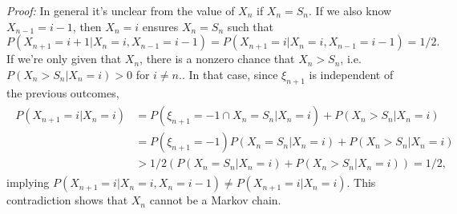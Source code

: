 \documentclass[10pt]{article}
\begin{document}
\textit{Proof:} In general it's unclear from the value of $X_n$ if $X_n = S_n$. 
If we also know $X_{n-1} = i-1$, then $X_{n}=i$ ensures $X_n = S_n$
such that
\begin{equation*}
  P(X_{n+1} = i+1| X_n = i, X_{n-1} = i-1) 
  = P(X_{n+1} = i \vert X_n = i, X_{n-1} = i-1) = 1/2.
\end{equation*}
If we're only given that $X_n$, there is a nonzero chance that
$X_n > S_n$, i.e. $P(X_n > S_n \vert X_n = i) > 0 $ for $i \ne n$..
In that case, since $\xi_{n+1}$ is independent of the previous outcomes,
\begin{eqnarray}
\begin{aligned}
  P(X_{n+1} = i \vert X_n = i)
  & = P(\xi_{n+1} = - 1  \cap X_n = S_n\vert X_n = i) + P(X_n > S_n \vert X_n = i) \\ 
  & = P(\xi_{n+1} = -1) P(X_n = S_n\vert X_n = i) + P(X_n > S_n \vert X_n = i) \\ 
  & > 1/2 \left( P(X_n = S_n\vert X_n = i) + P(X_n > S_n \vert X_n = i) \right) = 1/2,
\end{aligned}
\end{eqnarray}
implying $P(X_{n+1} = i \vert X_n = i, X_{n}=i-1) \ne P(X_{n+1} = i \vert X_n = i)$.
This contradiction shows that $X_n$ cannot be a Markov chain.
\end{document}

